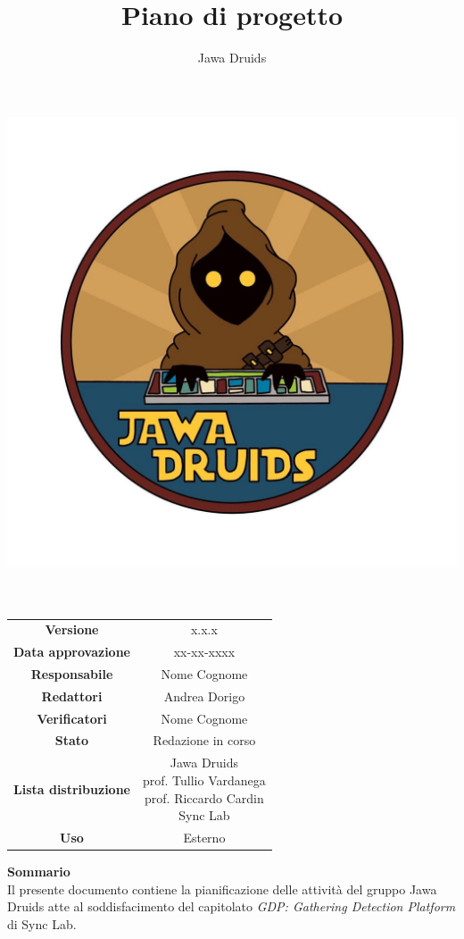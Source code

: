 \documentclass[a4paper,12pt]{report}
\begin{document}
\makeatletter
\begin{titlepage}
    \begin{center}
    \vspace*{-5,0cm}
    \author{Jawa Druids}
    \title{Piano di progetto}
    \date{} %
    \includegraphics[width=0.7\linewidth]{../immagini/DRUIDSLOGO.jpg}\\[4ex]
    {\huge \bfseries  \@title }\\[2ex]
    {\LARGE  \@author}\\[50ex]
    \vspace*{-8,0cm}
    \begin{table}[H]
        \centering
        \begin{tabular}{c|c}
            \textbf{Versione} & x.x.x \\
            \textbf{Data approvazione} & xx-xx-xxxx\\
            \textbf{Responsabile} & Nome Cognome\\
            \textbf{Redattori} & Andrea Dorigo \\
            \textbf{Verificatori} & Nome Cognome \\
            \textbf{Stato} & Redazione in corso\\
            \textbf{Lista distribuzione} & \makecell{Jawa Druids \\ prof. Tullio Vardanega \\ prof. Riccardo Cardin \\ Sync Lab}\\
            \textbf{Uso} & Esterno
        \end{tabular}
    \end{table}
					\vspace{.4cm}
	\hfill \break
    \fontsize{17}{10}\textbf{Sommario}\\
		\vspace{.3cm}
    Il presente documento contiene la pianificazione delle attività del gruppo Jawa Druids atte al soddisfacimento del capitolato \normalsize\textit{GDP: Gathering Detection Platform} di Sync Lab.
    \end{center}
\end{titlepage}
\makeatother


\tableofcontents{}


\end{document}
